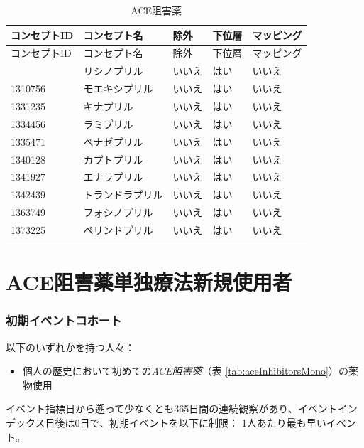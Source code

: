 \documentclass[
  11pt]{book}
\providecommand{\tightlist}{%
  \setlength{\itemsep}{0pt}\setlength{\parskip}{0pt}}
\theoremstyle{definition}
\theoremstyle{definition}
\theoremstyle{definition}
\theoremstyle{definition}
\theoremstyle{remark}
\begin{document}
\begin{longtable}[]{@{}lllll@{}}
\caption{\label{tab:aceInhibitors} ACE阻害薬}\tabularnewline
\toprule\noalign{}
コンセプトID & コンセプト名 & 除外 & 下位層 & マッピング \\
\midrule\noalign{}
\endfirsthead
\toprule\noalign{}
コンセプトID & コンセプト名 & 除外 & 下位層 & マッピング \\
\midrule\noalign{}
\endhead
\bottomrule\noalign{}
\endlastfoot
1308216 & リシノプリル & いいえ & はい & いいえ \\
1310756 & モエキシプリル & いいえ & はい & いいえ \\
1331235 & キナプリル & いいえ & はい & いいえ \\
1334456 & ラミプリル & いいえ & はい & いいえ \\
1335471 & ベナゼプリル & いいえ & はい & いいえ \\
1340128 & カプトプリル & いいえ & はい & いいえ \\
1341927 & エナラプリル & いいえ & はい & いいえ \\
1342439 & トランドラプリル & いいえ & はい & いいえ \\
1363749 & フォシノプリル & いいえ & はい & いいえ \\
1373225 & ペリンドプリル & いいえ & はい & いいえ \\
\end{longtable}

\section{ACE阻害薬単独療法新規使用者}\label{AceInhibitorsMono}

\subsubsection*{初期イベントコホート}\label{ux521dux671fux30a4ux30d9ux30f3ux30c8ux30b3ux30dbux30fcux30c8}

以下のいずれかを持つ人々：

\begin{itemize}
\tightlist
\item
  個人の歴史において初めての\emph{ACE阻害薬}（表 \ref{tab:aceInhibitorsMono}）の薬物使用
\end{itemize}

イベント指標日から遡って少なくとも365日間の連続観察があり、イベントインデックス日後は0日で、初期イベントを以下に制限： 1人あたり最も早いイベント。
\end{document}
